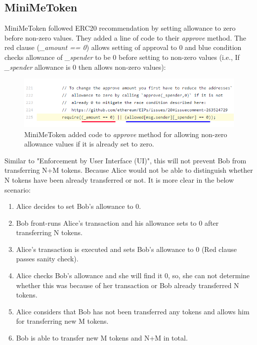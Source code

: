 \subsection{MiniMeToken}
MiniMeToken\cite{Ref15} followed ERC20 recommendation by setting allowance to zero before non-zero values. They added a line of code to their \textit{approve} method. The red clause (\textit{\_amount == 0}) allows setting of approval to 0 and blue condition checks allowance of \textit{\_spender} to be 0 before setting to non-zero values (i.e., If \textit{\_spender} allowance is 0 then allows non-zero values):
\begin{figure}[t]
	\centering
	\includegraphics[width=1.0\linewidth]{figures/multiple_withdrawal_06.png}
	\caption{MiniMeToken added code to \textit{approve} method for allowing non-zero allowance values if it is already set to zero.}
\end{figure}
\noindent Similar to "Enforcement by User Interface (UI)", this will not prevent Bob from transferring N+M tokens. Because Alice would not be able to distinguish whether N tokens have been already transferred or not. It is more clear in the below scenario:
\begin{enumerate}
	\item Alice decides to set Bob’s allowance to 0.
	\item Bob front-runs Alice’s transaction and his allowance sets to 0 after transferring N tokens.
	\item Alice’s transaction is executed and sets Bob’s allowance to 0 (Red clause passes sanity check).
	\item Alice checks Bob’s allowance and she will find it 0, so, she can not determine whether this was because of her transaction or Bob already transferred N tokens.
	\item Alice considers that Bob has not been transferred any tokens and allows him for transferring new M tokens.
	\item Bob is able to transfer new M tokens and N+M in total.
\end{enumerate}

